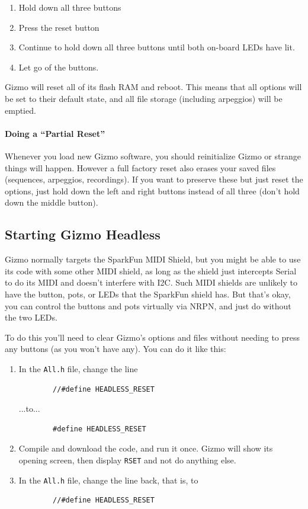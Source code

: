 \documentclass{article}
\begin{document}
\begin{enumerate}
\item Hold down all three buttons
\item Press the reset button
\item Continue to hold down all three buttons until both on-board LEDs have lit.
\item Let go of the buttons.
\end{enumerate}

Gizmo will reset all of its flash RAM and reboot.  This means that all options will be set to their default state, and all file storage (including arpeggios) will be emptied.

\paragraph{Doing a ``Partial Reset''} Whenever you load new Gizmo software, you should reinitialize Gizmo or strange things will happen.  However a full factory reset also erases your saved files (sequences, arpeggios, recordings).  If you want to preserve these but just reset the options, just hold down the left and right buttons instead of all three (don't hold down the middle button).

\subsection{Starting Gizmo Headless}

Gizmo normally targets the SparkFun MIDI Shield, but you might be able to use its code with some other MIDI shield, as long as the shield just intercepts Serial to do its MIDI and doesn't interfere with I2C.  Such MIDI shields are unlikely to have the button, pots, or LEDs that the SparkFun shield has.  But that's okay, you can control the buttons and pots virtually via NRPN, and just do without the two LEDs.

To do this you'll need to clear Gizmo's options and files without needing to press any buttons (as you won't have any).  You can do it like this:

\begin{enumerate}
\item In the \texttt{All.h} file, change the line 
\begin{verbatim}
        //#define HEADLESS_RESET
\end{verbatim}
...to...
\begin{verbatim}
        #define HEADLESS_RESET
\end{verbatim}
\item Compile and download the code, and run it once.  Gizmo will show its opening screen, then display \texttt{RSET} and not do anything else.
\item In the \texttt{All.h} file, change the line back, that is, to 
\begin{verbatim}
        //#define HEADLESS_RESET
\end{verbatim}

\end{enumerate}
\end{document}
